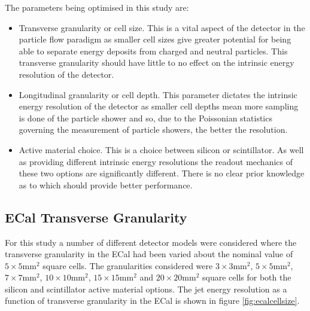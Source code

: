 The parameters being optimised in this study are:
\begin{itemize}
\item Transverse granularity or cell size.  This is a vital aspect of the detector in the particle flow paradigm as smaller cell sizes give greater potential for being able to separate energy deposits from charged and neutral particles.  This transverse granularity should have little to no effect on the intrinsic energy resolution of the detector.  
\item Longitudinal granularity or cell depth.  This parameter dictates the intrinsic energy resolution of the detector as smaller cell depths mean more sampling is done of the particle shower and so, due to the Poissonian statistics governing the measurement of particle showers, the better the resolution.
\item Active material choice.  This is a choice between silicon or scintillator.  As well as providing different intrinsic energy resolutions the readout mechanics of these two options are significantly different.  There is no clear prior knowledge as to which should provide better performance. 
\end{itemize}


\subsection{ECal Transverse Granularity}
\label{sec:ecalcells}
For this study a number of different detector models were considered where the transverse granularity in the ECal had been varied about the nominal value of $5 \times 5 \text{mm}^{2}$ square cells.  The granularities considered were $3 \times 3 \text{mm}^{2}$, $5 \times 5 \text{mm}^{2}$, $7 \times 7 \text{mm}^{2}$, $10 \times 10 \text{mm}^{2}$, $15 \times 15 \text{mm}^{2}$ and $20 \times 20 \text{mm}^{2}$ square cells for both the silicon and scintillator active material options.  The jet energy resolution as a function of transverse granularity in the ECal is shown in figure \ref{fig:ecalcellsize}.


